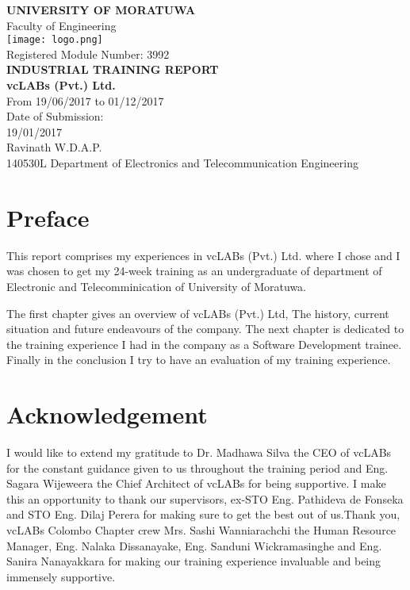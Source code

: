 \documentclass[12pt]{report}
\begin{document}
\begin{titlepage}
    \begin{center}
    	\Large
        \vspace{1cm}
        \textbf{UNIVERSITY OF MORATUWA}\\
        Faculty of Engineering\\
        \vspace{.5cm}
        \texttt{[image: logo.png]}\\
        \vspace{0.5cm}
        Registered Module Number: 3992\\
        \vspace{1cm}
        \textbf{INDUSTRIAL TRAINING REPORT}\\
        \vspace{1cm}
        \textbf{vcLABs (Pvt.) Ltd.}\\
        \vspace{1cm}
        From 19/06/2017 to 01/12/2017\\
        \vspace{.5cm}
        Date of Submission:\\
        19/01/2017\\
        \vspace{.5cm}
        Ravinath W.D.A.P.\\
        140530L Department of Electronics and Telecommunication Engineering
    \end{center}
\end{titlepage}
\renewcommand{\thepage}{\roman{page}}
\chapter*{Preface}
This report comprises my experiences in vcLABs (Pvt.) Ltd. where I chose and I was chosen to get my 24-week training as an undergraduate of department of Electronic and Telecomminication of University of Moratuwa.

The first chapter gives an overview of vcLABs (Pvt.) Ltd, The history, current situation and future endeavours of the company. The next chapter is dedicated to the training experience I had in the company as a Software Development trainee. Finally in the conclusion I try to have an evaluation of my training experience.

\chapter*{Acknowledgement}
I would like to extend my gratitude to Dr. Madhawa Silva the CEO of vcLABs for the constant guidance given to us throughout the training period and Eng. Sagara Wijeweera the Chief Architect of vcLABs for being supportive. I make this an opportunity to thank our supervisors, ex-STO Eng. Pathideva de Fonseka and STO Eng. Dilaj Perera for making sure to get the best out of us.Thank you, vcLABs Colombo Chapter crew Mrs. Sashi Wanniarachchi the Human Resource Manager, Eng. Nalaka Dissanayake, Eng. Sanduni Wickramasinghe and Eng. Sanira Nanayakkara for making our training experience invaluable and being immensely supportive.
\end{document}
